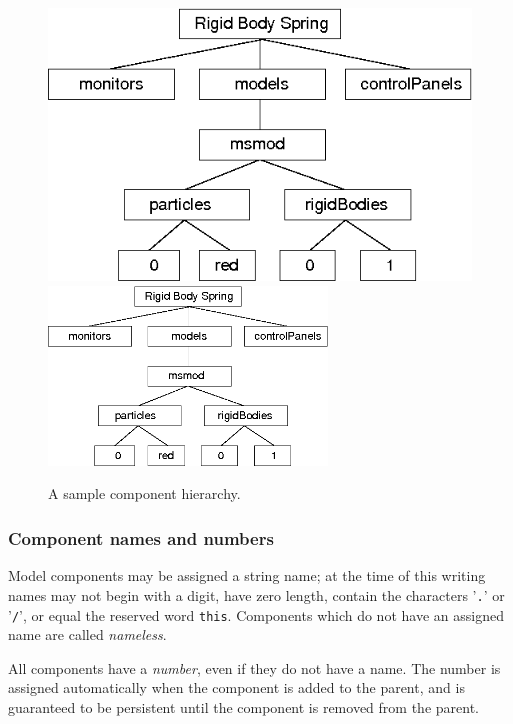 \documentclass{article}
\begin{document}
\begin{figure}
\begin{center}
\iflatexml
\includegraphics[]{images/hierarchy}
\else
\includegraphics[width=0.66\textwidth]{images/hierarchy}
\fi
\end{center}
\caption{A sample component hierarchy.}%
\label{hierarchyFig}
\end{figure}

\subsubsection{Component names and numbers}

Model components may be assigned a string name; at the time of
this writing names may not begin with a digit, have zero length, contain
the characters '{\tt .}' or '{\tt /}', or equal the reserved word {\tt this}.
Components which do not have an assigned name are
called {\it nameless}.

All components have a {\it number}, even if they do not have a name. The
number is assigned automatically when the component is added to the
parent, and is guaranteed to be persistent until the component is
removed from the parent.
\end{document}
